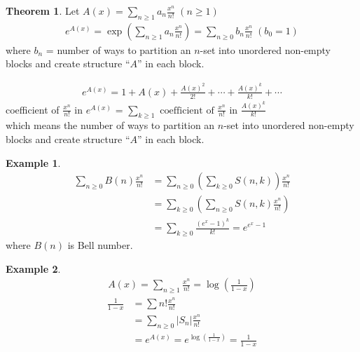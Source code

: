 \documentclass{article}
\theoremstyle{definition}
\newtheorem{thm}{Theorem}[]
\newtheorem{ex}{Example}[]
\newenvironment{pf*}{\pushQED{\qed}\pf}{\popQED\endpf}
\begin{document}
\begin{thm}
    Let $A(x) = \sum_{n \ge 1} a_n \frac{x^n}{n!} \; (n \ge 1)$
    \begin{align*}
        e^{A(x)} = \exp \left(\sum_{n\ge 1} a_n \frac{x^n}{n!}\right) 
        = \sum_{n \ge 0} b_n \frac{x^n}{n!} \; (b_0 = 1)
    \end{align*}
    where $b_n$ = number of ways to partition an $n$-set into unordered
    non-empty blocks and create structure ``$A$'' in each block.
\end{thm}
\begin{pf*}
    \begin{align*}
        e^{A(x)} = 1 + A(x) + \frac{A(x)^2}{2!} + \cdots + \frac{A(x)^k}{k!} + \cdots
    \end{align*}
    coefficient of $\frac{x^n}{n!}$ in $e^{A(x)}$ = $\sum_{k\ge 1} 
    \text{ coefficient of } \frac{x^n}{n!} \text{ in } \frac{A(x)^k}{k!}$
    \\ which means the number of ways to partition an 
    $n$-set into unordered
    non-empty blocks and create structure ``$A$'' in each block.
\end{pf*}
\begin{ex}
    \begin{align*}
        \sum_{n\ge 0} B(n) \frac{x^n}{n!}
        &= \sum_{n \ge 0} \left(\sum_{k \ge 0} S(n, k)\right)\frac{x^n}{n!} \\ 
        &= \sum_{k \ge 0} \left( \sum_{n \ge 0} S(n,k) \frac{x^n}{n!}\right) \\ 
        &= \sum_{k \ge 0} \frac{(e^x -1)^k}{k!} = e^{e^x - 1}
    \end{align*}
    where $B(n)$ is Bell number. 
\end{ex}
\begin{ex}
    \begin{align*}
        A(x) = \sum_{n\ge 1} \frac{x^n}{n!} = \log \left(\frac{1}{1-x}\right)
    \end{align*}
    \begin{align*}
        \frac{1}{1-x } &= \sum n! \frac{x^n}{n!} \\ 
        &= \sum_{n\ge 0} \vert S_n \vert \frac{x^n}{n!} \\ 
        &= e^{A(x)} = e^{\log \left(\frac{1}{1-x}\right)} = \frac{1}{1-x}
    \end{align*}
\end{ex}
\end{document}

